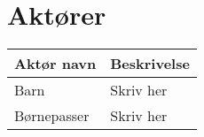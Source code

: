 \section{Aktører}



\begin{table}[!htbp] \centering
	\begin{tabular}{|p{2.5cm}|p{11.5cm}|}
	\hline
		\textbf{Aktør navn} & \textbf{Beskrivelse} \\\hline
		Barn &Skriv her 
		\\\hline
		Børnepasser & Skriv her 
		\\\hline
	\end{tabular}
\end{table}
